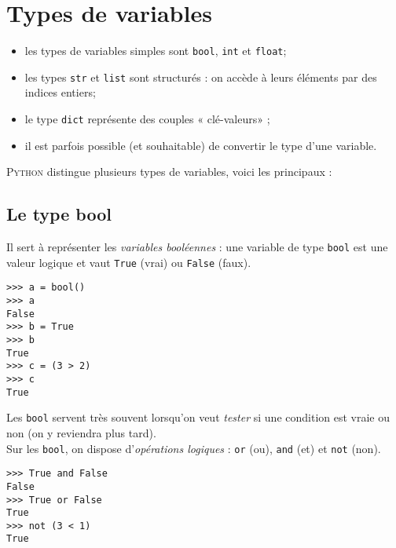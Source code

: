 \chapter{Types de variables}
\label{ch:types}
\begin{aretenir}
    \begin{itemize}
        \item 	les types de variables simples sont \texttt{bool}, \texttt{int} et \texttt{float};
        \item 	les types \texttt{str} et \texttt{list} sont structurés : on accède à leurs éléments par des indices entiers;
        \item 	le type \texttt{dict} représente des couples « clé-valeurs» ;
        \item 	il est parfois possible (et souhaitable) de convertir le type d'une variable.
    \end{itemize}
\end{aretenir}
\textsc{Python} distingue plusieurs types de variables, voici les principaux :
\section{Le type bool}
Il sert à représenter les \textit{variables booléennes} : une variable de type \texttt{bool} est une valeur logique et vaut \texttt{True} (vrai) ou
\texttt{False} (faux).


\begin{pyc}\begin{verbatim}
>>> a = bool()
>>> a
False
>>> b = True
>>> b
True
>>> c = (3 > 2)
>>> c
True
\end{verbatim}
\end{pyc}

Les \texttt{bool} servent très souvent lorsqu'on veut \textit{tester} si une condition est vraie ou non (on y reviendra plus tard).\\
Sur les \texttt{bool}, on dispose d'\textit{opérations logiques} : \texttt{or} (ou), \texttt{and} (et) et \texttt{not} (non).

\begin{pyc}\begin{verbatim}
>>> True and False
False
>>> True or False
True
>>> not (3 < 1)
True
\end{verbatim}
\end{pyc}

